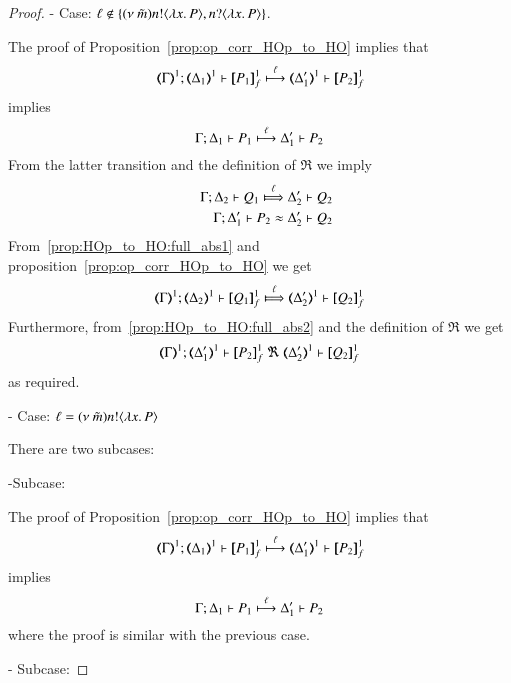 \begin{proof}
	\noi - Case: $\ell \notin \{(\nu\ \tilde{m}) n ! \langle \lambda x.\,P \rangle, n ? \langle \lambda x.\,P \rangle\}$.

	\noi The proof of Proposition~\ref{prop:op_corr_HOp_to_HO} implies that
%
	\[
		\horel{\mapt{\Gamma}^{1}}{\mapt{\Delta_1}^{1}}{\pmapp{P_1}{1}{f}}{\hby{\ell}}{\mapt{\Delta_1'}^{1}}{\pmapp{P_2}{1}{f}}
	\]
%
	\noi implies
%
	\[
		\Gamma; \Delta_1 \vdash P_1 \stackrel{\ell}{\longmapsto} \Delta_1' \vdash P_2
	\]
%
	\noi From the latter transition and the definition of $\Re$ we imply
%
	\begin{eqnarray}
		&&\horel{\Gamma}{\Delta_2}{Q_1}{\Hby{\ell}}{\Delta_2'}{Q_2}
		\label{prop:HOp_to_HO:full_abs1}
		\\
		&&\horel{\Gamma}{\Delta_1'}{P_2}{\wb}{\Delta_2'}{Q_2}
		\label{prop:HOp_to_HO:full_abs2}
	\end{eqnarray}
%
	\noi From~\ref{prop:HOp_to_HO:full_abs1} and proposition~\ref{prop:op_corr_HOp_to_HO} we get
%
	\[
		\horel{\mapt{\Gamma}^{1}}{\mapt{\Delta_2}^{1}}{\pmapp{Q_1}{1}{f}}{\Hby{\ell}}{\mapt{\Delta_2'}^{1}}{\pmapp{Q_2}{1}{f}}
	\]
%
	\noi Furthermore, from~\ref{prop:HOp_to_HO:full_abs2} and the definition of $\Re$ we get
%
	\[
		\horel{\mapt{\Gamma}^{1}}{\mapt{\Delta_1'}^{1}}{\pmapp{P_2}{1}{f}}{\ \Re\ }{\mapt{\Delta_2'}^{1}}{\pmapp{Q_2}{1}{f}}
	\]
%
	\noi as required.

	\noi - Case: $\ell = (\nu\ \tilde{m}) n ! \langle \lambda x.\,P \rangle$

	\noi There are two subcases:

	\noi -Subcase:

	\noi The proof of Proposition~\ref{prop:op_corr_HOp_to_HO} implies that
%
	\[
		\horel{\mapt{\Gamma}^{1}}{\mapt{\Delta_1}^{1}}{\pmapp{P_1}{1}{f}}{\hby{\ell}}{\mapt{\Delta_1'}^{1}}{\pmapp{P_2}{1}{f}}
	\]
%
	\noi implies
%
	\[
		\Gamma; \Delta_1 \vdash P_1 \stackrel{\ell}{\longmapsto} \Delta_1' \vdash P_2
	\]
%
	\noi where the proof is similar with the previous case.

	\noi - Subcase:


\end{proof}
